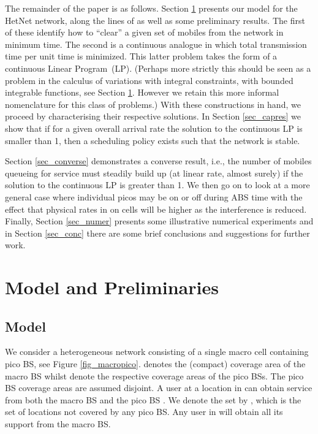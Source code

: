 \documentclass[12pt, draftcls, onecolumn]{IEEEtranTCOM}
\begin{document}
The remainder of the paper is as follows. Section
\ref{sec_model} presents our model for the HetNet network, along the lines of
\cite{ICC2013} as well as some preliminary results.  The first of these identify how to
``clear'' a given set of mobiles from the network in minimum time. The second is
a continuous analogue in which total transmission time per unit time is
minimized. This latter problem takes the form of a continuous Linear Program~(LP). (Perhaps more strictly
this should be seen as a problem in the calculus of variations with integral constraints, with bounded
integrable functions, see Section \ref{sec_model}. However we retain this more informal nomenclature for this class
of problems.) With these constructions in hand, we proceed by characterising their respective solutions.
In Section \ref{sec_capres} we show that if for a given overall arrival rate 
the solution to the continuous LP is smaller than 1, then a scheduling policy exists
such that the network is stable.

Section \ref{sec_converse} demonstrates a converse result, i.e.,
the number of mobiles queueing for service must steadily build up (at linear rate, almost surely) if
the solution to the continuous LP is greater than 1.  We then go on to
look at a more general case where individual picos may be on or off
during ABS time with the effect that physical rates in on cells will be higher
as the interference is reduced. Finally, Section \ref{sec_numer}
presents some illustrative numerical experiments and in Section \ref{sec_conc} there are some brief conclusions
and suggestions for further work.

\section{Model and Preliminaries}
\label{sec_model}
\subsection{Model}
We consider a heterogeneous network consisting of a single macro cell
containing  pico BS, see Figure \ref{fig_macropico}.  denotes the (compact) coverage area of
the macro BS whilst  denote the
respective coverage areas of the pico BSs. The pico BS coverage
areas are assumed disjoint. A user at a location in  can obtain service from
both the macro BS and the pico BS . We denote the set  by , which is the set of
locations not covered by any pico BS. Any user in  will obtain all its support from
the macro BS.
\end{document}
